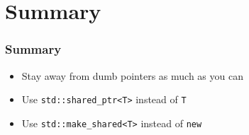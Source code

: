 \section{Summary}
\frame{\tableofcontents[currentsection]}

\begin{frame}
  \frametitle{Summary}
  \begin{itemize}
    \item Stay away from dumb pointers as much as you can
    \item Use \texttt{std::shared\_ptr<T>} instead of \texttt{T}
    \item Use \texttt{std::make\_shared<T>} instead of \texttt{new}
  \end{itemize}
\end{frame}




